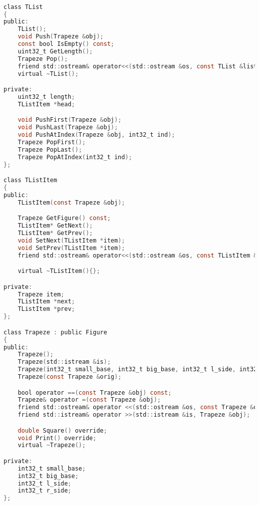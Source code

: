 \begin{lstlisting}[language=C]

class TList
{
public:
    TList();
    void Push(Trapeze &obj);
    const bool IsEmpty() const;
    uint32_t GetLength();
    Trapeze Pop();
    friend std::ostream& operator<<(std::ostream &os, const TList &list);
    virtual ~TList();

private:
    uint32_t length;
    TListItem *head;

    void PushFirst(Trapeze &obj);
    void PushLast(Trapeze &obj);
    void PushAtIndex(Trapeze &obj, int32_t ind);
    Trapeze PopFirst();
    Trapeze PopLast();
    Trapeze PopAtIndex(int32_t ind);
};

class TListItem
{
public:
    TListItem(const Trapeze &obj);

    Trapeze GetFigure() const;
    TListItem* GetNext();
    TListItem* GetPrev();
    void SetNext(TListItem *item);
    void SetPrev(TListItem *item);
    friend std::ostream& operator<<(std::ostream &os, const TListItem &obj);

    virtual ~TListItem(){};

private:
    Trapeze item;
    TListItem *next;
    TListItem *prev;
};

class Trapeze : public Figure
{
public:
    Trapeze();
    Trapeze(std::istream &is);
    Trapeze(int32_t small_base, int32_t big_base, int32_t l_side, int32_t r_side);
    Trapeze(const Trapeze &orig);

    bool operator ==(const Trapeze &obj) const;
    Trapeze& operator =(const Trapeze &obj);
    friend std::ostream& operator <<(std::ostream &os, const Trapeze &obj);
    friend std::istream& operator >>(std::istream &is, Trapeze &obj);

    double Square() override;
    void Print() override;
    virtual ~Trapeze();

private:
    int32_t small_base;
    int32_t big_base;
    int32_t l_side;
    int32_t r_side;
};



\end{lstlisting}


